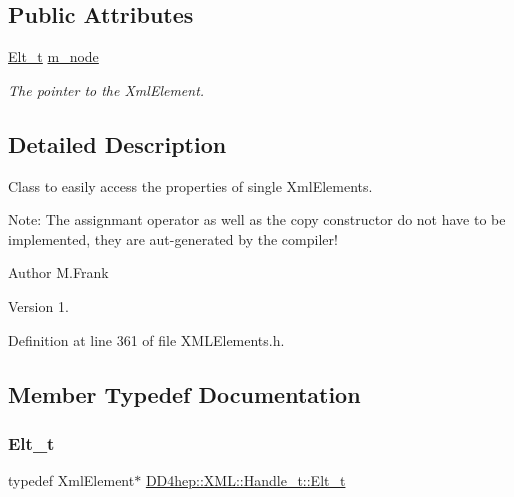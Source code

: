 \subsection*{Public Attributes}
\begin{DoxyCompactItemize}
\item 
\hyperlink{class_d_d4hep_1_1_x_m_l_1_1_handle__t_a81a72155f29971b37652430a334a6b30}{Elt\+\_\+t} \hyperlink{class_d_d4hep_1_1_x_m_l_1_1_handle__t_afa133bf6ff332a64464594429061f036}{m\+\_\+node}
\begin{DoxyCompactList}\small\item\em The pointer to the Xml\+Element. \end{DoxyCompactList}\end{DoxyCompactItemize}


\subsection{Detailed Description}
Class to easily access the properties of single Xml\+Elements. 

Note\+: The assignmant operator as well as the copy constructor do not have to be implemented, they are aut-\/generated by the compiler!

\begin{DoxyAuthor}{Author}
M.\+Frank 
\end{DoxyAuthor}
\begin{DoxyVersion}{Version}
1. 
\end{DoxyVersion}


Definition at line 361 of file X\+M\+L\+Elements.\+h.



\subsection{Member Typedef Documentation}
\hypertarget{class_d_d4hep_1_1_x_m_l_1_1_handle__t_a81a72155f29971b37652430a334a6b30}{}\label{class_d_d4hep_1_1_x_m_l_1_1_handle__t_a81a72155f29971b37652430a334a6b30} 
\subsubsection{\texorpdfstring{Elt\+\_\+t}{Elt\_t}}
{\footnotesize\ttfamily typedef Xml\+Element$\ast$ \hyperlink{class_d_d4hep_1_1_x_m_l_1_1_handle__t_a81a72155f29971b37652430a334a6b30}{D\+D4hep\+::\+X\+M\+L\+::\+Handle\+\_\+t\+::\+Elt\+\_\+t}}



